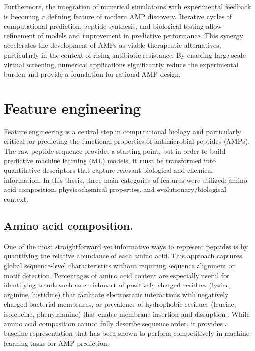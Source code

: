 \documentclass[a4paper,twoside,12pt]{book}
\begin{document}
Furthermore, the integration of numerical simulations with experimental feedback is becoming a defining feature of modern AMP discovery. Iterative cycles of computational prediction, peptide synthesis, and biological testing allow refinement of models and improvement in predictive performance. This synergy accelerates the development of AMPs as viable therapeutic alternatives, particularly in the context of rising antibiotic resistance. By enabling large-scale virtual screening, numerical applications significantly reduce the experimental burden and provide a foundation for rational AMP design.
\section{Feature engineering}

Feature engineering is a central step in computational biology and particularly critical for predicting the functional properties of antimicrobial peptides (AMPs). The raw peptide sequence provides a starting point, but in order to build predictive machine learning (ML) models, it must be transformed into quantitative descriptors that capture relevant biological and chemical information. In this thesis, three main categories of features were utilized: amino acid composition, physicochemical properties, and evolutionary/biological context.

\subsection{Amino acid composition.}
One of the most straightforward yet informative ways to represent peptides is by quantifying the relative abundance of each amino acid. This approach captures global sequence-level characteristics without requiring sequence alignment or motif detection. Percentages of amino acid content are especially useful for identifying trends such as enrichment of positively charged residues (lysine, arginine, histidine) that facilitate electrostatic interactions with negatively charged bacterial membranes, or prevalence of hydrophobic residues (leucine, isoleucine, phenylalanine) that enable membrane insertion and disruption \cite{bib:kang2019features}. While amino acid composition cannot fully describe sequence order, it provides a baseline representation that has been shown to perform competitively in machine learning tasks for AMP prediction.
\end{document}
